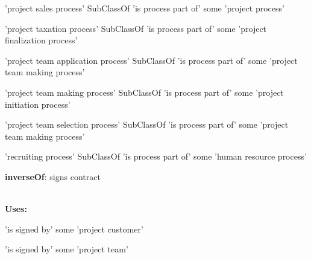 \documentclass[a4paper, DIV=13, BCOR=0cm]{scrbook}
\begin{document}
\begin{mdframed}[style=onto, frametitle={is process part of}]
{\begin{compactitem}
			\item 'project sales process' SubClassOf 'is process part of' some 'project process'
			\item 'project taxation process' SubClassOf 'is process part of' some 'project finalization process'
			\item 'project team application process' SubClassOf 'is process part of' some 'project team making process'
			\item 'project team making process' SubClassOf 'is process part of' some 'project initiation process'
			\item 'project team selection process' SubClassOf 'is process part of' some 'project team making process'
			\item 'recruiting process' SubClassOf 'is process part of' some 'human resource process'
		\end{compactitem}
	} %
\end{mdframed}

\begin{mdframed}[style=onto, frametitle={is signed by}]
	{%
		\begin{compactitem}
			\item \textbf{inverseOf}: signs contract
		\end{compactitem}
		\hrulefill\\
		\textbf{Uses:}
		\begin{compactitem}
			\item 'is signed by' some 'project customer'
			\item 'is signed by' some 'project team'
		\end{compactitem}
	} %
\end{mdframed}
\end{document}
